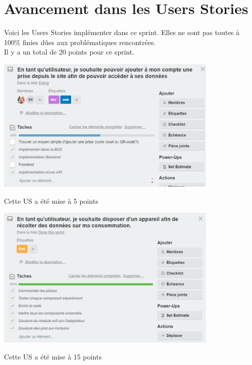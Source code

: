 \section{Avancement dans les Users Stories}
Voici les Users Stories implémenter dans ce sprint. Elles ne sont pas toutes à 100\% finies dûes aux problématiques rencontrées.\\
Il y a un total de 20 points pour ce sprint. \\
\begin{center}
    \includegraphics[width=0.8\textwidth]{images/US01.png}~\\[0.5cm]
 \end{center}
 \begin{flushright}
    Cette US a été mise à 5 points \\
 \end{flushright}
\begin{center}
    \includegraphics[width=0.8\textwidth]{images/US02.png}~\\[0.5cm]
 \end{center}
 \begin{flushright}
    Cette US a été mise à 15 points \\ 
\end{flushright}

